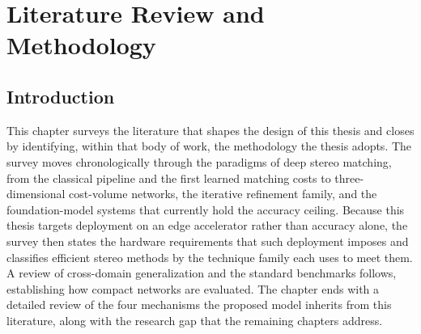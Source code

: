 \chapter{Literature Review and Methodology}

\section{Introduction}
This chapter surveys the literature that shapes the design of this
thesis and closes by identifying, within that body of work, the
methodology the thesis adopts. The survey moves chronologically through
the paradigms of deep stereo matching, from the classical pipeline and
the first learned matching costs to three-dimensional cost-volume
networks, the iterative refinement family, and the foundation-model
systems that currently hold the accuracy ceiling. Because this thesis
targets deployment on an edge accelerator rather than accuracy alone,
the survey then states the hardware requirements that such deployment
imposes and classifies efficient stereo methods by the technique family
each uses to meet them. A review of cross-domain generalization and the
standard benchmarks follows, establishing how compact networks are
evaluated. The chapter ends with a detailed review of the four
mechanisms the proposed model inherits from this literature, along with
the research gap that the remaining chapters address.

